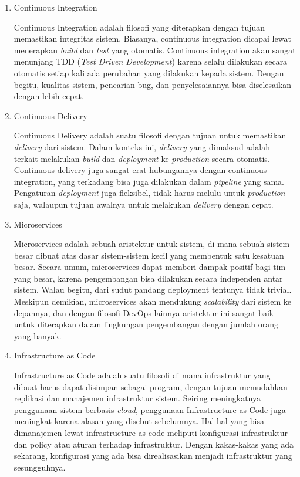 \begin{enumerate}
  \item Continuous Integration
  
  Continuous Integration adalah filosofi yang diterapkan dengan tujuan memastikan integritas sistem.
  Biasanya, continuous integration dicapai lewat menerapkan \textit{build} dan \textit{test} yang otomatis.
  Continuous integration akan sangat menunjang TDD (\textit{Test Driven Development}) karena selalu dilakukan secara otomatis setiap kali ada perubahan yang dilakukan kepada sistem.
  Dengan begitu, kualitas sistem, pencarian bug, dan penyelesaiannya bisa diselesaikan dengan lebih cepat.

  \item Continuous Delivery
  
  Continuous Delivery adalah suatu filosofi dengan tujuan untuk memastikan \textit{delivery} dari sistem.
  Dalam konteks ini, \textit{delivery} yang dimaksud adalah terkait melakukan \textit{build} dan \textit{deployment} ke \textit{production} secara otomatis.
  Continuous delivery juga sangat erat hubungannya dengan continuous integration, yang terkadang bisa juga dilakukan dalam \textit{pipeline} yang sama.
  Pengaturan \textit{deployment} juga fleksibel, tidak harus melulu untuk \textit{production} saja, walaupun tujuan awalnya untuk melakukan \textit{delivery} dengan cepat.

  \item Microservices
  
  Microservices adalah sebuah aristektur untuk sistem, di mana sebuah sistem besar dibuat atas dasar sistem-sistem kecil yang membentuk satu kesatuan besar.
  Secara umum, microservices dapat memberi dampak positif bagi tim yang besar, karena pengembangan bisa dilakukan secara independen antar sistem.
  Walau begitu, dari sudut pandang deployment tentunya tidak trivial.
  Meskipun demikian, microservices akan mendukung \textit{scalability} dari sistem ke depannya, dan dengan filosofi DevOps lainnya aristektur ini sangat baik untuk diterapkan dalam lingkungan pengembangan dengan jumlah orang yang banyak. 

  \item Infrastructure as Code
  
  Infrastructure as Code adalah suatu filosofi di mana infrastruktur yang dibuat harus dapat disimpan sebagai program, dengan tujuan memudahkan replikasi dan manajemen infrastruktur sistem.
  Seiring meningkatnya penggunaan sistem berbasis \textit{cloud}, penggunaan Infrastructure as Code juga meningkat karena alasan yang disebut sebelumnya.
  Hal-hal yang bisa dimanajemen lewat infrastructure as code meliputi konfigurasi infrastruktur dan policy atau aturan terhadap infrastruktur.
  Dengan kakas-kakas yang ada sekarang, konfigurasi yang ada bisa direalisasikan menjadi infrastruktur yang sesungguhnya.


\end{enumerate}
